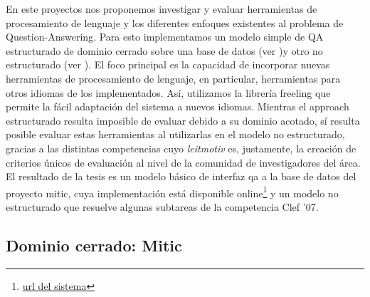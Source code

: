 En este proyectos nos proponemos investigar y evaluar herramientas de procesamiento de lenguaje y los diferentes enfoques existentes al problema
de Question-Answering. Para esto implementamos un modelo simple de QA estructurado de dominio cerrado sobre una base de datos (ver )y otro 
no estructurado (ver ). El foco principal es la capacidad de incorporar nuevas herramientas de procesamiento de lenguaje, en particular,
herramientas para otros idiomas de los implementados. Así, utilizamos la librería freeling que permite la fácil adaptación del sistema a nuevos idiomas.
Mientras el approach estructurado resulta imposible de evaluar debido a su dominio acotado, sí resulta posible evaluar estas herramientas al utilizarlas en el modelo no estructurado, gracias a las distintas competencias cuyo \textit{leitmotiv} es, justamente, la creación de criterios únicos de evaluación al nivel de la comunidad de investigadores del área. El resultado de la tesis es un modelo básico de interfaz qa a la base de datos del proyecto mitic, cuya implementación está disponible online\footnote{\url{url del sistema}} y un modelo no estructurado que resuelve algunas subtareas de la competencia Clef '07.


\subsection{Dominio cerrado: Mitic}
\label{subsec:mitic}

